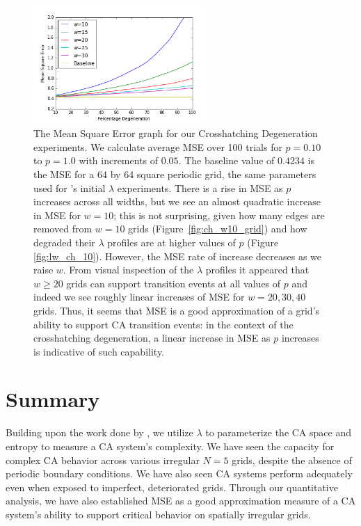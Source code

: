 \documentclass[a4paper,11pt]{report}
\begin{document}
\begin{figure}[htp]
\centering
\includegraphics[width=0.6\textwidth]{ch6_figs/ch_mse_10_30}
\caption[Mean Squared Error for Crosshatching Degeneration]{
  The Mean Square Error graph for our Crosshatching Degeneration experiments. We calculate average MSE over 100 trials for $p=0.10$ to $p=1.0$ with increments of $0.05$. The baseline value of $0.4234$ is the MSE for a 64 by 64 square periodic grid, the same parameters used for \citeauthor{wo90}'s initial $\lambda$ experiments. There is a rise in MSE as $p$ increases across all widths, but we see an almost quadratic increase in MSE for $w=10$; this is not surprising, given how many edges are removed from $w=10$ grids (Figure~\ref{fig:ch_w10_grid}) and how degraded their $\lambda$ profiles are at higher values of $p$ (Figure  \ref{fig:lw_ch_10}). However, the MSE rate of increase decreases as we raise $w$. From visual inspection of the $\lambda$ profiles it appeared that $w \ge 20$ grids can support transition events at all values of $p$ and indeed we see roughly linear increases of MSE for $w=20,30,40$ grids. Thus, it seems that MSE is a good approximation of a grid's ability to support CA transition events: in the context of the crosshatching degeneration, a linear increase in MSE as $p$ increases is indicative of such capability. 
}
\label{fig:ch_mse}
\end{figure}

\section{Summary}

Building upon the work done by \citeauthor{wo90}, we utilize $\lambda$ to parameterize the CA space and entropy to measure a CA system's complexity. We have seen the capacity for complex CA behavior across various irregular $N=5$ grids, despite the absence of periodic boundary conditions. We have also seen CA systems perform adequately even when exposed to imperfect, deteriorated grids. Through our quantitative analysis, we have also established MSE as a good approximation measure of a CA system's ability to support critical behavior on spatially irregular grids.
\end{document}
